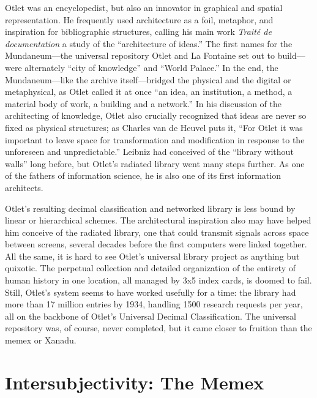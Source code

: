 Otlet was an encyclopedist, but also an innovator in graphical and spatial representation. He frequently used architecture as a foil, metaphor, and inspiration for bibliographic structures, calling his main work \emph{Trait\'{e} de documentation} a study of the ``architecture of ideas.''\autocite[129]{van_de_heuvel_building_2008} The first names for the Mundaneum---the universal repository Otlet and La Fontaine set out to build---were alternately ``city of knowledge'' and ``World Palace.'' In the end, the Mundaneum---like the archive itself---bridged the physical and the digital or metaphysical, as Otlet called it at once ``an idea, an institution, a method, a material body of work, a building and a network.''\autocite[130]{van_de_heuvel_building_2008} In his discussion of the architecting of knowledge, Otlet also crucially recognized that ideas are never so fixed as physical structures; as Charles van de Heuvel puts it, ``For Otlet it was important to leave space for transformation and modification in response to the unforeseen and unpredictable.''\autocite[131]{van_de_heuvel_building_2008} Leibniz had conceived of the ``library without walls'' long before, but Otlet's radiated library went many steps further. As one of the fathers of information science, he is also one of its first information architects.

Otlet's resulting decimal classification and networked library is less bound by linear or hierarchical schemes. The architectural inspiration also may have helped him conceive of the radiated library, one that could transmit signals across space between screens, several decades before the first computers were linked together. All the same, it is hard to see Otlet's universal library project as anything but quixotic. The perpetual collection and detailed organization of the entirety of human history in one location, all managed by 3x5 index cards, is doomed to fail. Still, Otlet's system seems to have worked usefully for a time: the library had more than 17 million entries by 1934, handling 1500 research requests per year, all on the backbone of Otlet's Universal Decimal Classification.\autocite{_limited_2001} The universal repository was, of course, never completed, but it came closer to fruition than the memex or Xanadu.


\section{Intersubjectivity: The Memex}

